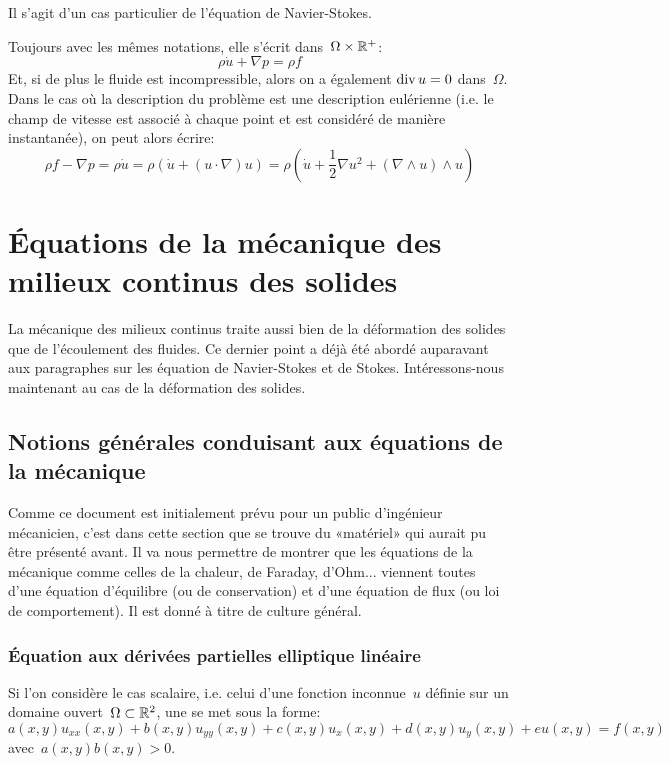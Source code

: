 Il s'agit d'un cas particulier de l'équation de Navier-Stokes.

\medskip
Toujours avec les mêmes notations, elle s'écrit dans~$\Omega\times\mathbb R^+$:
\begin{equation}
\rho \dot{u} + \nabla p = \rho f
\end{equation}
Et, si de plus le fluide est incompressible, alors on a également 
$\operatorname{div} u = 0$ dans~$\Omega$.
\medskipvm{}
Dans le cas où la description du problème est une description eulérienne (i.e. le champ de vitesse est associé à chaque point et est considéré de manière instantanée), on peut alors écrire:
\begin{equation}
  \rho f - \nabla p = \rho \dot{u} =
	\rho \left(\dot{u} + (u\cdot\nabla)u \right)=
	\rho \left( \dot{u} + \frac12 \nabla u^2 + (\nabla\wedge u)\wedge u \right)
\end{equation}
\medskipvm
{}

\medskip
\section{Équations de la mécanique des milieux continus des solides}
La mécanique des milieux continus traite aussi bien de la déformation des solides que de l'écoulement des fluides. Ce dernier point a déjà été abordé auparavant aux paragraphes sur les équation de Navier-Stokes et de Stokes. Intéressons-nous maintenant au cas de la déformation des solides.

\medskip{}
\subsection{Notions générales conduisant aux équations de la mécanique}
Comme ce document est initialement prévu pour un public d'ingénieur mécanicien, c'est dans cette section que se trouve du «matériel» qui aurait pu être présenté avant. Il va nous permettre de montrer que les équations de la mécanique comme celles de la chaleur, de Faraday, d'Ohm... viennent toutes d'une équation d'équilibre (ou de conservation) et d'une équation de flux (ou loi de comportement). Il est donné à titre de culture général.

\medskip
\subsubsection{Équation aux dérivées partielles elliptique linéaire}
Si l'on considère le cas scalaire, i.e. celui d'une fonction inconnue~$u$ définie sur un domaine ouvert~$\Omega\subset\mathbb R^2$, une  se met sous la forme:
\begin{equation}a(x, y)u_{xx}(x, y) + b(x, y)u_{yy}(x, y) + c(x, y)u_x(x, y) + d(x, y)u_y(x, y) + eu(x, y) = f(x, y)\end{equation}
avec~$a(x, y)b(x, y) > 0$.

